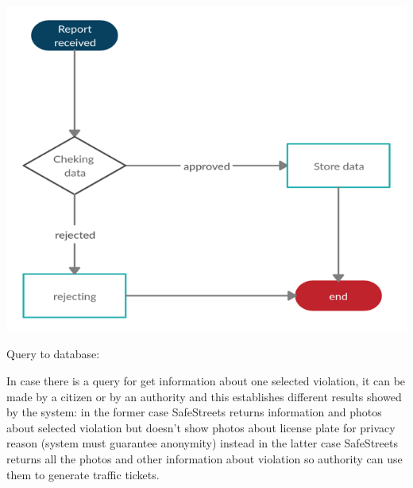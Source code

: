 \documentclass[../RASD.tex]{subfiles}
\begin{document}
    \begin{center}
        \includegraphics{assets/report.png}\\
    \end{center}

    Query to database:

    In case there is a query for get information about one selected violation, it can be made by a citizen or by an authority and this establishes different results showed by the system: in the former case SafeStreets returns information and photos about selected violation but doesn’t show photos about license plate for privacy reason (system must guarantee anonymity) instead in the latter case SafeStreets returns all the photos and other information about violation so authority can use them to generate traffic tickets.
\end{document}
